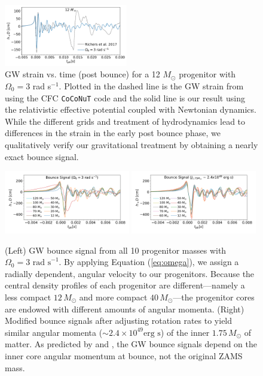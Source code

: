 \documentclass[twocolumn,times]{aastex62}  %
\begin{document}
 \begin{figure}[t]
    \centering
    \includegraphics[width=0.48\textwidth]{figures/bounce_richers.pdf}
    \caption{GW strain vs. time (post bounce) for a 12 \(M_\odot\) progenitor \citep{woosley:2007} with $\Omega_0 = 3$ rad s$^{-1}$.  Plotted in the dashed line is the GW strain from \citet{richers:2017} using the CFC \texttt{CoCoNuT} code and the solid line is our result using the relativistic effective potential coupled with Newtonian dynamics.  While the different grids and treatment of hydrodynamics lead to differences in the strain in the early post bounce phase, we qualitatively verify our gravitational treatment by obtaining a nearly exact bounce signal. }
    \label{fig:bounce_cfc}
\end{figure}

\begin{figure}[t]
  \centering     %
  \includegraphics[width=0.49\textwidth]{figures/hd3_bounce_test.pdf}
  \includegraphics[width=0.49\textwidth]{figures/hdj_bounce_final.pdf}
  \caption{(Left) GW bounce signal from all 10 progenitor masses with $\Omega_0 = 3 \text{ rad s}^{-1}$.  By applying Equation (\ref{eq:omega}), we assign a radially dependent, angular velocity to our progenitors.  Because the central density profiles of each progenitor are different---namely a less compact $12\,M_\odot$ and more compact $40\,M_\odot$---the progenitor cores are endowed with different amounts of angular momenta.   (Right) Modified bounce signals after adjusting rotation rates to yield similar angular momenta ($\sim 2.4\times10^{49} \text{erg s}$) of the inner $1.75\,M_\odot$ of matter.  As predicted by \citet{dimm:2008} and \citet{abdik:2010,abdik:2014}, the GW bounce signals depend on the inner core angular momentum at bounce, not the original ZAMS mass.}
  \label{fig:bounce}
\end{figure}
\end{document}
